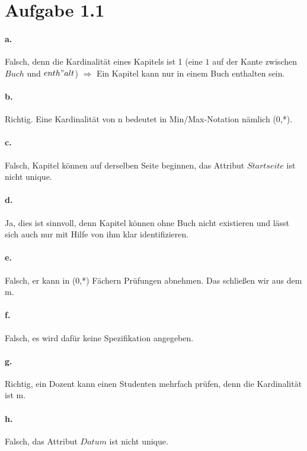 \documentclass{article}
\begin{document}
	
	
	
	
	\section*{Aufgabe 1.1}
	\paragraph*{a.} Falsch, denn die Kardinalität eines Kapitels ist 1 (eine $1$ auf der Kante zwischen $Buch$ und $enth"alt$) $\Rightarrow$ Ein Kapitel kann nur in einem Buch enthalten sein.
	
	\paragraph*{b.} Richtig. Eine Kardinalität von n bedeutet in Min/Max-Notation nämlich (0,*).
	
	\paragraph*{c.} Falsch, Kapitel können auf derselben Seite beginnen, das Attribut $Startseite$ ist nicht unique.
	
	\paragraph*{d.} Ja, dies ist sinnvoll, denn Kapitel können ohne Buch nicht existieren und lässt sich auch nur mit Hilfe von ihm klar identifizieren.
	
	\paragraph*{e.}Falsch, er kann in (0,*) Fächern Prüfungen abnehmen. Das schließen wir aus dem m.
	
	\paragraph*{f.}Falsch, es wird dafür keine Spezifikation angegeben.
	
	\paragraph*{g.}Richtig, ein Dozent kann einen Studenten mehrfach prüfen, denn die Kardinalität ist m. 
	
	\paragraph*{h.}Falsch, das Attribut $Datum$ ist nicht unique.
	
\end{document}
